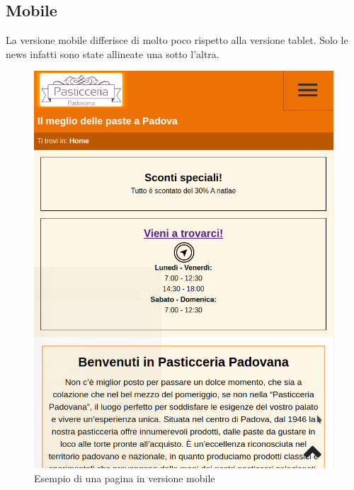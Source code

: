 \subsection{Mobile}
La versione mobile differisce di molto poco rispetto alla versione tablet. Solo le news infatti sono state allineate una sotto l'altra.
\begin{figure}[!h]
    \centering		  
	\includegraphics[width=0.8\linewidth]{sezioni/Progettazione/Immagini/mobile_example.png}
	\caption{Esempio di una pagina in versione mobile}
	\label{Fig:verMobile}
\end{figure}
\newpage

